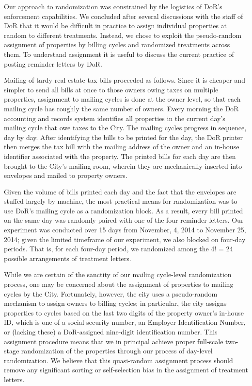 \documentclass[12pt,titlepage]{article}
\begin{document}
Our approach to randomization was constrained by the logistics of
DoR's enforcement capabilities. We concluded after several discussions
with the staff of DoR that it would be difficult in practice
to assign individual properties at random to different
treatments. Instead, we chose to exploit the pseudo-random assignment
of properties by billing cycles and randomized treatments across them.
To understand assignment it is useful to discuss the current
practice of posting reminder letters by DoR.

Mailing of tardy real estate tax bills proceeded as follows.  Since it is
cheaper and simpler to send all bills at once to those owners owing
taxes on multiple properties, assignment to mailing cycles is done at the
owner level, so that each mailing cycle has roughly the same number of
owners.  Every morning the DoR accounting and records system
identifies all properties in the current day's mailing cycle that owe taxes to the City.
The mailing cycles progress in sequence,
day by day.  After identifying the bills to be printed for the day,
the DoR printer then merges the tax bill with the mailing address of
the owner and an in-house identifier associated with the property.
The printed bills for each day are then brought to the City's mailing
room, wherein they are mechanically inserted into envelopes and mailed
to property owners.
	
Given the volume of bills printed each day and the fact that the 
envelopes are stuffed largely by machine, the most practical means 
for randomization was to use DoR's mailing cycle as a randomization block.  As a result, 
every bill printed on the same day was randomly paired with one of the four 
reminder letters. Our experiment was conducted 
over 15 days from  November, 4, 2014 to November 25, 2014; given the limited timeframe
of our experiment, we also blocked on four-day periods. That is, for each 
four-day period, we randomized among the 4! = 24 possible 
arrangements of treatment letters.  

While we are certain of the sanctity of our mailing cycle-level
randomization process, one may be concerned about the assignment of
properties to mailing cycles by the City. Fortunately, however, the city uses a
pseudo-random mechanism to assign owners to billing cycles; in
particular, the city assigns properties to cycles based on the last
two digits of the property owner's in-house ID, which is one of a social 
security number, an Employer Identification Number, or (lacking these) a DoR-assigned 
nine-digit identification number. This assignment procedure means that we in principal achieve proper 
full-scale two-stage randomization of the properties through our process 
of day-level randomization. We believe that this quasi-random
assignment process should remove any significant sorting or self-selection bias in
the assignment of treatment letters.
\end{document}
